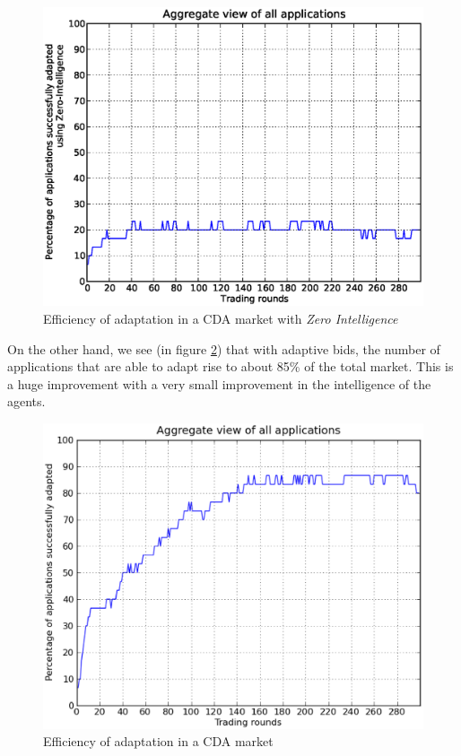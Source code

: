 \documentclass[10pt,journal,compsoc]{IEEEtran}
\begin{document}
\begin{figure}[h]
	\centering
    \includegraphics[scale=0.45, clip, trim=0cm 1cm 1cm 0.8cm]{Figure9.eps}
    \caption{Efficiency of adaptation in a CDA market with \textit{Zero Intelligence}\label{fig:cda_zi_market_satisfaction}}
\end{figure}

On the other hand, we see (in figure \ref{fig:cda_zip_market_satisfaction}) that with adaptive bids, the number of applications that are able to adapt rise to about 85\% of the total market. This is a huge improvement with a very small improvement in the intelligence of the agents.
\begin{figure}[h]
	\centering
	 \includegraphics[scale=0.45, clip, trim=0cm 1cm 2cm 0.8cm]{Figure10.eps}
	 \caption{Efficiency of adaptation in a CDA market \label{fig:cda_zip_market_satisfaction}}
\end{figure} 
\end{document}
